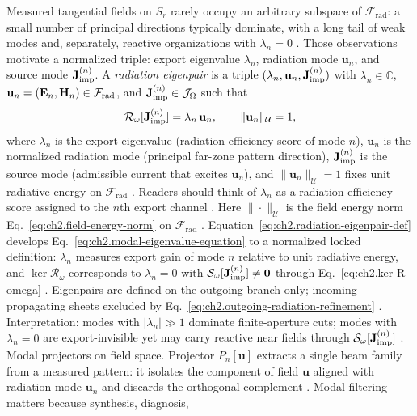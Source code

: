 Measured tangential fields on $S_r$ rarely occupy an arbitrary subspace of
$\mathcal{F}_{\mathrm{rad}}$: a small number of principal directions typically dominate, with a
long tail of weak modes and, separately, reactive organizations with $\lambda_n=0$
\cite{hansen1988,devaney2004}. Those observations motivate a normalized triple: export
eigenvalue $\lambda_n$, radiation mode $\mathbf{u}_n$, and source mode $\mathbf{J}_{\mathrm{imp}}^{(n)}$. A
\emph{radiation eigenpair} is a triple $(\lambda_n,\mathbf{u}_n,\mathbf{J}_{\mathrm{imp}}^{(n)})$ with
\(\lambda_n\in\mathbb{C}\), \(\mathbf{u}_n=(\mathbf{E}_n,\mathbf{H}_n)\in\mathcal{F}_{\mathrm{rad}}\), and
\(\mathbf{J}_{\mathrm{imp}}^{(n)}\in\mathcal{J}_\Omega\) such that
\begin{equation}
\label{eq:ch2.radiation-eigenpair-def}
\mathcal{R}_\omega[\mathbf{J}_{\mathrm{imp}}^{(n)}]=\lambda_n\,\mathbf{u}_n,
\qquad
\|\mathbf{u}_n\|_{\mathcal{U}}=1,
\end{equation}
where $\lambda_n$ is the export eigenvalue (radiation-efficiency score of mode $n$),
$\mathbf{u}_n$ is the normalized radiation mode (principal far-zone pattern direction),
$\mathbf{J}_{\mathrm{imp}}^{(n)}$ is the source mode (admissible current that excites $\mathbf{u}_n$), and
$\|\mathbf{u}_n\|_{\mathcal{U}}=1$ fixes unit radiative energy on $\mathcal{F}_{\mathrm{rad}}$
\cite{stratton1941}. Readers should think of $\lambda_n$ as a radiation-efficiency score
assigned to the $n$th export channel \cite{harrington2001}. Here \(\|\cdot\|_{\mathcal{U}}\) is the field energy norm
Eq.~\eqref{eq:ch2.field-energy-norm} on \(\mathcal{F}_{\mathrm{rad}}\)
\cite{stratton1941}. Equation~\eqref{eq:ch2.radiation-eigenpair-def}
develops Eq.~\eqref{eq:ch2.modal-eigenvalue-equation} to a normalized
locked definition: \(\lambda_n\) measures export gain of mode \(n\) relative to unit radiative
energy, and \(\ker\mathcal{R}_\omega\) corresponds to \(\lambda_n=0\) with
\(\mathcal{S}_\omega[\mathbf{J}_{\mathrm{imp}}^{(n)}]\neq\mathbf{0}\) through
Eq.~\eqref{eq:ch2.ker-R-omega} \cite{stratton1941}. Eigenpairs are defined on the
outgoing branch only; incoming propagating sheets excluded by
Eq.~\eqref{eq:ch2.outgoing-radiation-refinement} \cite{harrington2001}.
Interpretation: modes with $|\lambda_n|\gg 1$ dominate finite-aperture cuts; modes with
$\lambda_n=0$ are export-invisible yet may carry reactive near fields through
$\mathcal{S}_\omega[\mathbf{J}_{\mathrm{imp}}^{(n)}]$ \cite{devaney2004}.
Modal projectors on field space. Projector $P_n[\mathbf{u}]$ extracts a single beam family from a measured pattern: it isolates
the component of field $\mathbf{u}$ aligned with radiation mode $\mathbf{u}_n$ and discards the
orthogonal complement \cite{stratton1941}. Modal filtering matters because synthesis, diagnosis,
